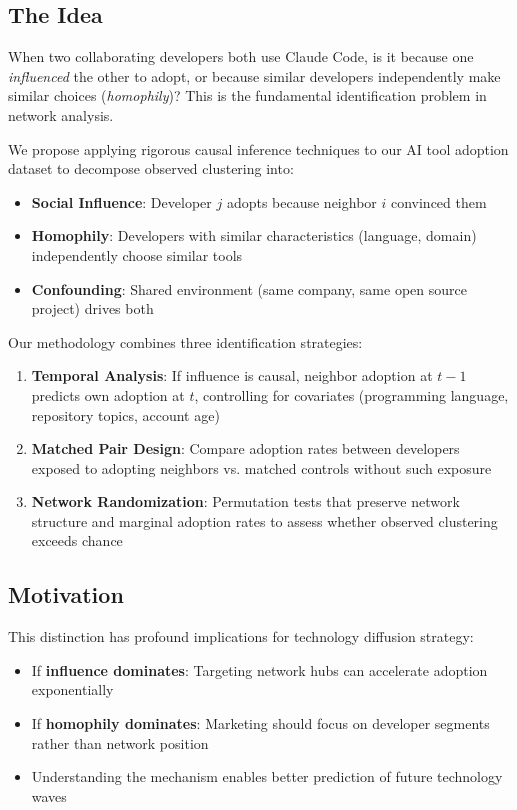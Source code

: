 \documentclass[11pt,letterpaper]{article}
\begin{document}
\subsection*{The Idea}

When two collaborating developers both use Claude Code, is it because one \textit{influenced} the other to adopt, or because similar developers independently make similar choices (\textit{homophily})? This is the fundamental identification problem in network analysis.

We propose applying rigorous causal inference techniques to our AI tool adoption dataset to decompose observed clustering into:
\begin{itemize}
    \item \textbf{Social Influence}: Developer $j$ adopts because neighbor $i$ convinced them
    \item \textbf{Homophily}: Developers with similar characteristics (language, domain) independently choose similar tools
    \item \textbf{Confounding}: Shared environment (same company, same open source project) drives both
\end{itemize}

Our methodology combines three identification strategies:

\begin{enumerate}
    \item \textbf{Temporal Analysis}: If influence is causal, neighbor adoption at $t-1$ predicts own adoption at $t$, controlling for covariates (programming language, repository topics, account age)
    \item \textbf{Matched Pair Design}: Compare adoption rates between developers exposed to adopting neighbors vs. matched controls without such exposure
    \item \textbf{Network Randomization}: Permutation tests that preserve network structure and marginal adoption rates to assess whether observed clustering exceeds chance
\end{enumerate}

\subsection*{Motivation}

This distinction has profound implications for technology diffusion strategy:
\begin{itemize}
    \item If \textbf{influence dominates}: Targeting network hubs can accelerate adoption exponentially
    \item If \textbf{homophily dominates}: Marketing should focus on developer segments rather than network position
    \item Understanding the mechanism enables better prediction of future technology waves
\end{itemize}
\end{document}
